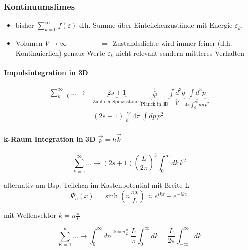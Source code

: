 \subsubsection{Kontinuumslimes} \label{abs.Kontinuumslimes}

\begin{itemize}
    \item bisher $\sum_{k=0}^\infty f(\varepsilon)$ d.h. Summe über Einteilchenzustände mit Energie $\varepsilon_k$.
    \item  Volumen $V \rightarrow \infty \hspace{2cm} \Rightarrow$ Zustandsdichte wird immer feiner (d.h. Kontinuierlich) 
    genaue Werte $\varepsilon_k$ nicht relevant sondern mittleres Verhalten
    \end{itemize}

    \paragraph{Impulsintegration in 3D}
    \begin{align}
         \sum_{k=0}^\infty ... \longrightarrow &\underbrace{2s+1}_{\text{Zahl der Spinzustände}} \underbrace{\frac{1}{h^3}}_{\text{Planck in 3D}} \underbrace{\int d^3q}_{V} \underbrace{\int d^3p}_{4\pi \int_0^\infty dp \, p^2} \\
   &(2s+1) \ \frac{V}{h^3}\  4\pi \ \int dp \, p^2
    \end{align}

\paragraph{k-Raum Integration in 3D $\Vec{p} =\hbar \Vec{k}$}

\begin{equation}
    \sum_{k=0}^\infty... \longrightarrow (2s+1) \left( \frac{L}{2\pi}\right)^3 \int_0^\infty dk \, k^2
\end{equation}

alternativ am Bsp. Teilchen im Kastenpotential mit Breite L
\begin{equation}
    \Psi_n (x)= \sinh \left( n \frac{\pi x}{L} \right)  \approx e^{ikx} - e^{-ikx}
\end{equation}

mit Wellenvektor $k=n \frac{\pi}{L}$

\begin{equation}
    \sum_{K=1}^\infty ... \longrightarrow \int_0^\infty dn \overset{k=n\frac{\pi}{L}}{=} \frac{L}{\pi } \int_0^\infty dk = \frac{L}{2\pi} \int_{-\infty}^\infty dk
\end{equation}

